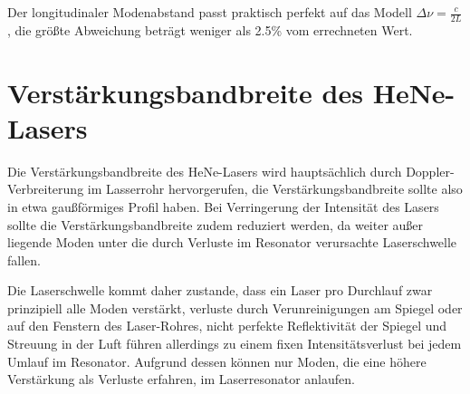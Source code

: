 \documentclass[bigchapter,colorback,accentcolor=tud4b,linedtoc,11pt]{tudreport}
\numberwithin{equation}{subsection}
\begin{document}
\FloatBarrier
Der longitudinaler Modenabstand passt praktisch perfekt auf das Modell $\Delta\nu = \frac{c}{2L}$, die größte Abweichung beträgt weniger als 2.5\% vom errechneten Wert.
\section{Verstärkungsbandbreite des HeNe-Lasers}
Die Verstärkungsbandbreite des HeNe-Lasers wird hauptsächlich durch Doppler-Verbreiterung im Lasserrohr hervorgerufen, die Verstärkungsbandbreite sollte also in etwa gaußförmiges Profil haben. Bei Verringerung der Intensität des Lasers sollte die Verstärkungsbandbreite zudem reduziert werden, da weiter außer liegende Moden unter die durch Verluste im Resonator verursachte Laserschwelle fallen.

Die Laserschwelle kommt daher zustande, dass ein Laser pro Durchlauf zwar prinzipiell alle Moden verstärkt, verluste durch Verunreinigungen am Spiegel oder auf den Fenstern des Laser-Rohres, nicht perfekte Reflektivität der Spiegel und Streuung in der Luft führen allerdings zu einem fixen Intensitätsverlust bei jedem Umlauf im Resonator. Aufgrund dessen können nur Moden, die eine höhere Verstärkung als Verluste erfahren, im Laserresonator anlaufen.
\end{document}
